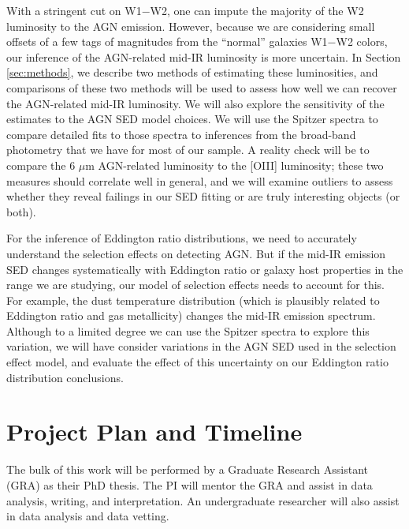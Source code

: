 \documentclass[12pt, preprint]{hacked-aastex}
\begin{document}
With a stringent cut on W1$-$W2, one can impute the majority of 
the W2 luminosity to the AGN emission. However, because we are
considering small offsets of a few tags of magnitudes from the 
``normal'' galaxies W1$-$W2 colors, our inference of the AGN-related
mid-IR luminosity is more uncertain. In Section \ref{sec:methods},
we describe two methods of estimating these luminosities, and comparisons
of these two methods will be used to assess how well we can recover
the AGN-related mid-IR luminosity. We will also explore the 
sensitivity of the estimates to the AGN SED model choices. 
We will use the Spitzer spectra to compare detailed fits to
those spectra to inferences from the broad-band photometry that we 
have for most of our sample. A reality check will be to compare
the 6 $\mu$m AGN-related luminosity to the [OIII] luminosity; these
two measures should correlate well in general, and we will 
examine outliers to assess whether they reveal failings in our
SED fitting or are truly interesting objects (or both).

For the inference of Eddington ratio distributions, we need to 
accurately understand the selection effects on detecting AGN. But 
if the mid-IR emission SED changes systematically with Eddington ratio
or galaxy host properties in the range we are studying, our model
of selection effects needs to account for this. For example, the
dust temperature distribution (which is plausibly related to Eddington 
ratio  and gas metallicity) changes the mid-IR emission spectrum.
Although to a limited degree we can use the Spitzer spectra to 
explore this variation, we will have consider variations in the
AGN SED used in the selection effect model, and evaluate the effect
of this uncertainty on our Eddington ratio distribution conclusions.

\section{Project Plan and Timeline\label{sec:plan}}

The bulk of this work will be performed by a Graduate Research
Assistant (GRA) as their PhD thesis.  The PI will mentor the GRA and 
assist in data analysis, writing, and interpretation. An undergraduate
researcher will also assist in data analysis and data vetting.
\end{document}
